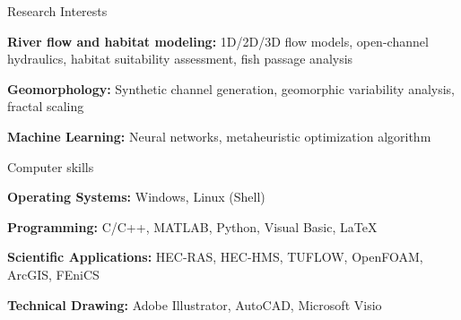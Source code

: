 \documentclass{resume_anzy} %
\begin{document}
\vspace{10mm}
\begin{rSection}{Research Interests}
\begin{rSubsection}{}{}{}{}
\vspace{-2.5mm}
\item {\bf River flow and habitat modeling:} 1D/2D/3D flow models, open-channel hydraulics, habitat suitability assessment, fish passage analysis
\item {\bf Geomorphology:} Synthetic channel generation, geomorphic variability analysis, fractal scaling
\item {\bf Machine Learning:} Neural networks, metaheuristic optimization algorithm
\end{rSubsection}
\end{rSection}

\begin{rSection}{Computer skills}
\begin{rSubsection}{}{}{}{}
\vspace{-2.5mm}
\item {\bf Operating Systems:} Windows, Linux (Shell)
\item {\bf Programming:} C/C++, MATLAB, Python, Visual Basic, \LaTeX
\item {\bf Scientific Applications:} HEC-RAS, HEC-HMS, TUFLOW, OpenFOAM, ArcGIS, FEniCS
\item {\bf Technical Drawing:} Adobe Illustrator, AutoCAD, Microsoft Visio
\end{rSubsection}
\end{rSection}

\end{document}
